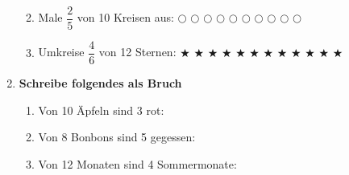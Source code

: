 \begin{enumerate}[label=\arabic*.]
\begin{enumerate}[label=\alph*)]
    \vspace{0.3cm}
    \item Male $\dfrac{2}{5}$ von 10 Kreisen aus: $\bigcirc$ $\bigcirc$ $\bigcirc$ $\bigcirc$ $\bigcirc$ $\bigcirc$ $\bigcirc$ $\bigcirc$ $\bigcirc$ $\bigcirc$

    \vspace{0.3cm}
    \item Umkreise $\dfrac{4}{6}$ von 12 Sternen: $\bigstar$ $\bigstar$ $\bigstar$ $\bigstar$ $\bigstar$ $\bigstar$ $\bigstar$ $\bigstar$ $\bigstar$ $\bigstar$ $\bigstar$ $\bigstar$
  \end{enumerate}

  \vspace{0.5cm}

  \item \textbf{Schreibe folgendes als Bruch}
  \begin{enumerate}[label=\alph*)]
    \item Von 10 Äpfeln sind 3 rot: \underline{\hspace{3cm}}
    \item Von 8 Bonbons sind 5 gegessen: \underline{\hspace{3cm}}
    \item Von 12 Monaten sind 4 Sommermonate: \underline{\hspace{3cm}}
  \end{enumerate}
\end{enumerate}